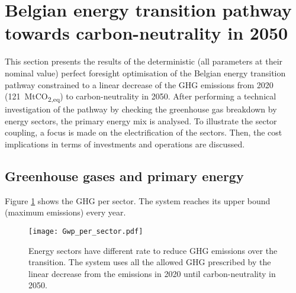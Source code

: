 \section{Belgian energy transition pathway towards carbon-neutrality in 2050} 
\label{app:bel_PF_TD}
This section presents the results of the deterministic (\ie all parameters at their nominal value) perfect foresight optimisation of the Belgian energy transition pathway constrained to a linear decrease of the \gls{GHG} emissions from 2020 (121~MtCO\textsubscript{2,eq}) to carbon-neutrality in 2050.  After performing a technical investigation of the pathway by checking the greenhouse gas breakdown by energy sectors, the primary energy mix is analysed. To illustrate the sector coupling, a focus is made on the electrification of the sectors. Then, the cost implications in terms of investments and operations are discussed.

\subsection{Greenhouse gases and primary energy}
Figure \ref{fig:pestd_ghg} shows the \acrfull{GHG} per sector. 
The system reaches its upper bound (\ie maximum emissions) every year. 

 \begin{figure}[!htbp]
\centering
\texttt{[image: Gwp\_per\_sector.pdf]}
\caption{Energy sectors have different rate to reduce \gls{GHG} emissions over the transition. The system uses all the allowed \gls{GHG} prescribed by the linear decrease from the emissions in 2020 until carbon-neutrality in 2050.}
\label{fig:pestd_ghg}
\end{figure}

